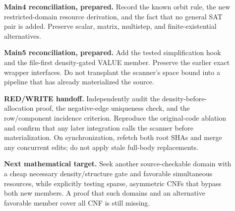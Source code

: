 \documentclass[11pt]{article}
\begin{document}
\begin{description}
\item[] \textbf{Main4 reconciliation, prepared.} Record the known orbit rule, the new restricted-domain resource derivation, and the fact that no general SAT pair is added. Preserve scalar, matrix, multistep, and finite-existential alternatives.
\item[] \textbf{Main5 reconciliation, prepared.} Add the tested simplification hook and the file-first density-gated VALUE member. Preserve the earlier exact wrapper interfaces. Do not transplant the scanner's space bound into a pipeline that has already materialized the source.
\item[] \textbf{RED/WRITE handoff.} Independently audit the density-before-allocation proof, the negative-edge uniqueness check, and the row/component incidence criterion. Reproduce the original-code ablation and confirm that any later integration calls the scanner before materialization. On synchronization, refetch both root SHAs and merge any concurrent edits; do not apply stale full-body replacements.
\item[] \textbf{Next mathematical target.} Seek another source-checkable domain with a cheap necessary density/structure gate and favorable simultaneous resources, while explicitly testing sparse, asymmetric CNFs that bypass both new members. A proof that such domains and an alternative favorable member cover all CNF is still missing.
\end{description}



\end{document}
